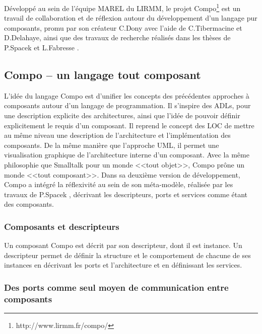     
    \label{sec:compo} 

    Développé au sein de l'équipe MAREL du LIRMM, le projet Compo\footnote{http://www.lirmm.fr/compo/} est un travail de collaboration et de réflexion autour du développement d'un langage pur composants, promu par son créateur C.Dony avec l'aide de C.Tibermacine et D.Delahaye, ainsi que des travaux de recherche réalisés dans les thèses de P.Spacek \cite{Spacek:2014:CMA:2602458.2602476} et L.Fabresse \cite{fabresse2007decoupage}.
    
    \subsection{Compo -- un langage tout composant}
    
L'idée du langage Compo est d'unifier les concepts des précédentes approches à composants autour d'un langage de programmation. Il s'inspire des ADLs, pour une description explicite des architectures, ainsi que l'idée de pouvoir définir explicitement le requis d'un composant. Il reprend le concept des LOC de mettre au même niveau une description de l'architecture et l'implémentation des composants. De la même manière que l'approche UML, il permet une visualisation graphique de l'architecture interne d'un composant. Avec la même philosophie que Smalltalk pour un monde <<tout objet>>, Compo prône un monde <<tout composant>>. Dans sa deuxième version de développement, Compo a intégré la réflexivité au sein de son méta-modèle, réalisée par les travaux de P.Spacek \cite{Spacek:2014:CMA:2602458.2602476}, décrivant les descripteurs, ports et services comme étant des composants. 
  
      \subsubsection{Composants et descripteurs}
    
    Un composant Compo est décrit par son descripteur, dont il est instance. Un descripteur permet de définir la structure et le comportement de chacune de ses instances en décrivant les ports et l'architecture et en définissant les services. 
    
      \subsubsection{Des ports comme seul moyen de communication entre composants}
      
